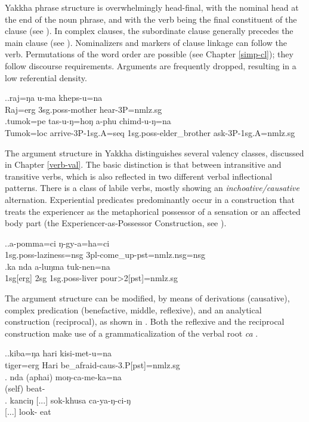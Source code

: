 Yakkha phrase structure is overwhelmingly  head-final, with the nominal head at the end of the noun phrase, and with the verb being the final constituent of the clause (see \Next[a]). In complex clauses, the subordinate clause generally precedes the main clause (see \Next[b]). Nominalizers and markers of clause linkage can follow the verb. Permutations of the word order are possible (see Chapter \ref{simp-cl}); they follow discourse requirements. Arguments are frequently dropped, resulting in a low referential density. 

\ex.\ag.raj=ŋa u-ma  kheps-u=na\\
Raj{\sc =erg} {\sc 3sg.poss-}mother hear{\sc [pst]-3P=nmlz.sg}\\
\bg.tumok=pe tas-u-ŋ=hoŋ a-phu chimd-u-ŋ=na\\
Tumok{\sc =loc} arrive{\sc [pst]-3P-1sg.A=seq} {\sc 1sg.poss-}elder\_brother ask{\sc [pst]-3P-1sg.A=nmlz.sg}\\

The argument structure in Yakkha distinguishes several valency classes, discussed in Chapter \ref{verb-val}. The basic distinction is that between intransitive and transitive verbs, which is also reflected in two different verbal inflectional patterns. There is a class of labile verbs, mostly showing an \emph{inchoative/causative} alternation. Experiential predicates predominantly occur in a construction that treats the experiencer as the metaphorical possessor of a sensation or an affected body part (the Experiencer-as-Possessor Construction, see \Next).

\ex.\ag.a-pomma=ci ŋ-gy-a=ha=ci\\
{\sc 1sg.poss-}laziness{\sc =nsg} {\sc 3pl-}come\_up{\sc -pst=nmlz.nsg=nsg}\\
\bg.ka nda         a-luŋma  tuk-nen=na\\
{\sc 1sg[erg]} {\sc 2sg} {\sc 1sg.poss-}liver pour{>2[pst]=nmlz.sg}\\


The argument structure can be modified, by means of derivations (causative), complex predication (benefactive, middle, reflexive), and an analytical construction (reciprocal), as shown in \Next. Both the  reflexive and the  reciprocal construction make use of a grammaticalization of the verbal root \emph{ca}  . 


\ex.\ag.kiba=ŋa hari kisi-met-u=na\\
tiger{\sc =erg} Hari be\_afraid{\sc -caus-3.P[pst]=nmlz.sg}\\
\bg. nda (aphai) moŋ-ca-me-ka=na\\
 (self) beat-\\
\bg. kanciŋ [...] sok-khusa ca-ya-ŋ-ci-ŋ\\
  [...] look- eat\\



